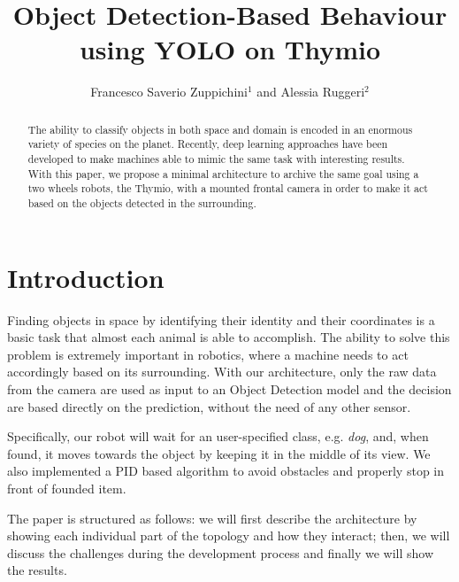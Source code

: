 \documentclass[letterpaper, 10 pt, conference]{ieeeconf}  %
\title{\LARGE \bf
Object Detection-Based Behaviour using YOLO on Thymio
}
\author{Francesco Saverio Zuppichini$^{1}$ and Alessia Ruggeri$^{2}$}%
\begin{document}
\maketitle
\thispagestyle{empty}
\pagestyle{empty}


\begin{abstract}
The ability to classify objects in both space and domain is encoded in an enormous variety of species on the planet. Recently, deep learning approaches have been developed to make machines able to mimic the same task with interesting results. With this paper, we propose a minimal architecture to archive the same goal using a two wheels robots, the Thymio, with a mounted frontal camera in order to make it act based on the objects detected in the surrounding. 
\end{abstract}

\section{Introduction}

Finding objects in space by identifying their identity and their coordinates is a basic task that almost each animal is able to accomplish. The ability to solve this problem is extremely important in robotics, where a machine needs to act accordingly based on its surrounding. With our architecture, only the raw data from the camera are used as input to an Object Detection model and the decision are based directly on the prediction, without the need of any other sensor.

Specifically, our robot will wait for an user-specified class, e.g. \emph{dog}, and, when found, it moves towards the object by keeping it in the middle of its view. We also implemented a PID based algorithm to avoid obstacles and properly stop in front of founded item.

The paper is structured as follows: we will first describe the architecture by showing each individual part of the topology and how they interact; then, we will discuss the challenges during the development process and finally we will show the results.
\end{document}

